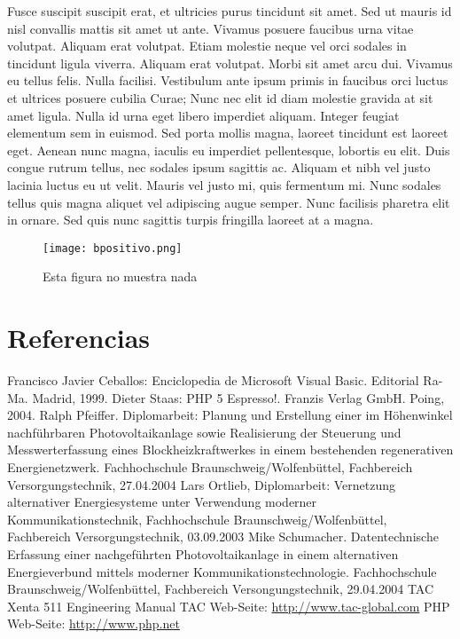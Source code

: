 \documentclass[twocolumn,a4paper,10pt]{article}
\begin{document}
Fusce suscipit suscipit erat, et ultricies purus tincidunt sit amet. Sed ut mauris id nisl convallis mattis sit amet ut ante. Vivamus posuere faucibus urna vitae volutpat. Aliquam erat volutpat. Etiam molestie neque vel orci sodales in tincidunt ligula viverra. Aliquam erat volutpat. Morbi sit amet arcu dui. Vivamus eu tellus felis.
Nulla facilisi. Vestibulum ante ipsum primis in faucibus orci luctus et ultrices posuere cubilia Curae; Nunc nec elit id diam molestie gravida at sit amet ligula. Nulla id urna eget libero imperdiet aliquam. Integer feugiat elementum sem in euismod. Sed porta mollis magna, laoreet tincidunt est laoreet eget. Aenean nunc magna, iaculis eu imperdiet pellentesque, lobortis eu elit. Duis congue rutrum tellus, nec sodales ipsum sagittis ac. Aliquam et nibh vel justo lacinia luctus eu ut velit. Mauris vel justo mi, quis fermentum mi. Nunc sodales tellus quis magna aliquet vel adipiscing augue semper. Nunc facilisis pharetra elit in ornare. Sed quis nunc sagittis turpis fringilla laoreet at a magna.
\begin{figure}
    \center \texttt{[image: bpositivo.png]}
    \caption{Esta figura no muestra nada}
\end{figure}


\section*{Referencias}
\begin{thebibliography}{99}
     Francisco Javier Ceballos: Enciclopedia de Microsoft Visual
        Basic. Editorial Ra-Ma. Madrid, 1999.
     Dieter Staas: PHP 5 Espresso!. Franzis Verlag GmbH.
        Poing, 2004.
     Ralph Pfeiffer. Diplomarbeit: Planung und
        Erstellung einer im Höhenwinkel nachführbaren Photovoltaikanlage
        sowie Realisierung der Steuerung und Messwerterfassung eines
        Blockheizkraftwerkes in einem bestehenden regenerativen
        Energienetzwerk. Fachhochschule Braunschweig/Wolfenbüttel,
        Fachbereich Versorgungstechnik, 27.04.2004
    Lars Ortlieb, Diplomarbeit: Vernetzung alternativer
        Energiesysteme unter Verwendung moderner Kommunikationstechnik,
        Fachhochschule Braunschweig/Wolfenbüttel, Fachbereich
        Versorgungstechnik, 03.09.2003
     Mike Schumacher. Datentechnische Erfassung einer
        nachgeführten Photovoltaikanlage in einem alternativen
        Energieverbund mittels moderner Kommunikationstechnologie.
        Fachhochschule Braunschweig/Wolfenbüttel, Fachbereich
        Versongungstechnik, 29.04.2004
     TAC Xenta 511 Engineering Manual
     TAC Web-Seite: \url{http://www.tac-global.com}
     PHP Web-Seite: \url{http://www.php.net}
\end{thebibliography}
\end{document}
